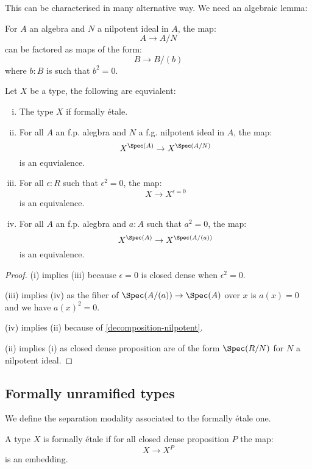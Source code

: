 This can be characterised in many alternative way. We need an algebraic lemma:

\begin{lemma}
\label{decomposition-nilpotent}
For $A$ an algebra and $N$ a nilpotent ideal in $A$, the map:
\[A
\to A/N
\] 
can be factored as maps of the form:
\[
B\to B/(b)
\]
where $b:B$ is such that $b^2=0$.
\end{lemma}

\begin{lemma}\label{equivalence-etale}
Let $X$ be a type, the following are equvialent:
\begin{enumerate}[(i)]
\item The type $X$ if formally étale.
\item For all $A$ an f.p. alegbra and $N$ a f.g. nilpotent ideal in $A$, the map:
\[X^{\Spec(A)}\to X^{\Spec(A/N)}\]
is an equvialence. 
\item For all $\epsilon:R$ such that $\epsilon^2=0$, the map:
\[X\to X^{\epsilon=0}\]
is an equivalence.
\item For all $A$ an f.p. alegbra and $a:A$ such that $a^2=0$, the map:
\[X^{\Spec(A)}\to X^{\Spec(A/(a))}\]
is an equivalence.
\end{enumerate}
\end{lemma}

\begin{proof}
(i) implies (iii) because $\epsilon=0$ is closed dense when $\epsilon^2=0$.

(iii) implies (iv) as the fiber of $\Spec(A/(a)) \to \Spec(A)$ over $x$ is $a(x)=0$ and we have $a(x)^2=0$.

(iv) implies (ii) because of \cref{decomposition-nilpotent}.

(ii) implies (i) as closed dense proposition are of the form $\Spec(R/N)$ for $N$ a nilpotent ideal.
\end{proof}


\subsection{Formally unramified types}

We define the separation modality \cite{TODO separated modalities} associated to the formally étale one.

\begin{definition}
A type $X$ is formally étale if for all closed dense proposition $P$ the map:
\[X\to X^P\]
is an embedding.
\end{definition}

